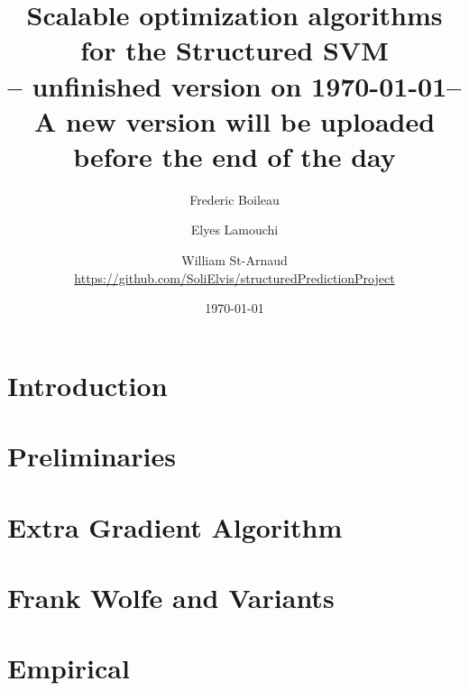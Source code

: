 


\usepackage{graphicx} %
\graphicspath{{figures/}} %
\usepackage[
  backend=biber,
  citestyle=authoryear-ibid,
  natbib=true
  ]{biblatex}
\usepackage{csquotes}
\usepackage{comment}

\usepackage{fancyhdr}
\pagestyle{fancyplain}
\fancyhf{}
\rhead{ \fancyplain{}{\today} }
\rfoot{ \fancyplain{}{\thepage} }
\renewcommand\nameyeardelim{, }

\usepackage[toc,page]{appendix}



\title{Scalable optimization algorithms for the Structured SVM\\ -- unfinished
  version on \today  -- \\ A new version will be uploaded before the end of the day}
\date{\today}
\author{Frederic Boileau \and Elyes Lamouchi \and William St-Arnaud \\
\url{https://github.com/SoliElvis/structuredPredictionProject}}

\maketitle
{}
\clearpage
\tableofcontents
\clearpage
\section{Introduction}


\clearpage
\section{Preliminaries}

% 

\clearpage
\section{Extra Gradient Algorithm}

\clearpage
\section{Frank Wolfe and Variants}


\clearpage
\section{Empirical}

% 


